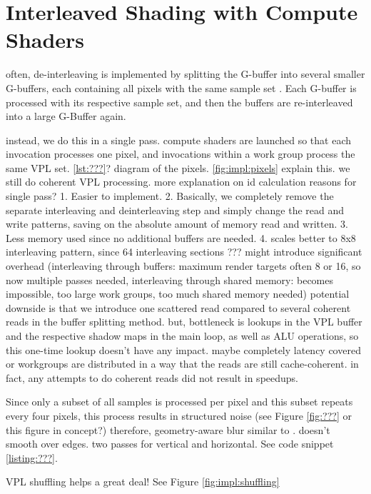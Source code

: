 \section{Interleaved Shading with Compute Shaders}
\label{sec:impl:interleavedShading}
\begin{outline}
\1 often, de-interleaving is implemented by splitting the G-buffer into several smaller G-buffers, each containing all pixels with the same sample set \cite{segovia2006non}. Each G-buffer is processed with its respective sample set, and then the buffers are re-interleaved into a large G-Buffer again.

\1 instead, we do this in a single pass. compute shaders are launched so that each invocation processes one pixel, and invocations within a work group process the same VPL set.
\1 \ref{lst:???}?
\1 diagram of the pixels. \ref{fig:impl:pixels} explain this. we still do coherent VPL processing.
\1 more explanation on id calculation
\1 reasons for single pass? 1. Easier to implement. 2. Basically, we completely remove the separate interleaving and deinterleaving step and simply change the read and write patterns, saving on the absolute amount of memory read and written. 3. Less memory used since no additional buffers are needed. 4. scales better to 8x8 interleaving pattern, since 64 interleaving sections ??? might introduce significant overhead (interleaving through buffers: maximum render targets often 8 or 16, so now multiple passes needed, interleaving through shared memory: becomes impossible, too large work groups, too much shared memory needed)
\1 potential downside is that we introduce one scattered read compared to several coherent reads in the buffer splitting method. but, bottleneck is lookups in the VPL buffer and the respective shadow maps in the main loop, as well as ALU operations, so this one-time lookup doesn't have any impact. maybe completely latency covered or workgroups are distributed in a way that the reads are still cache-coherent.
\1 in fact, any attempts to do coherent reads did not result in speedups.


\1 Since only a subset of all samples is processed per pixel and this subset repeats every four pixels, this process results in structured noise (see Figure \ref{fig:???} or this figure in concept?)
\1 therefore, geometry-aware blur similar to \citet{laine2007incremental}. doesn't smooth over edges. two passes for vertical and horizontal. See code snippet \ref{listing:???}.

\1 VPL shuffling helps a great deal! See Figure \ref{fig:impl:shuffling}
\end{outline}

